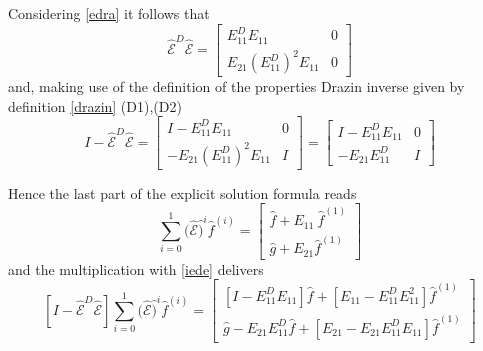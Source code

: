 \documentclass[a4paper,10pt,BCOR=15mm]{scrbook}
\begin{document}
Considering \eqref{edra} it follows that 
\begin{equation*} 
\hat {\mathcal E}^D \hat {\mathcal E} = \begin{bmatrix} E_{11}^DE_{11} & 0 \\ E_{21}(E_{11}^D)^2E_{11} & 0 \end{bmatrix}
\end{equation*}
and, making use of the definition of the properties Drazin inverse given by definition \ref{drazin} (D1),(D2)
\begin{equation}\label{iede}
  I-\hat {\mathcal E}^D \hat {\mathcal E} = \begin{bmatrix} I- E_{11}^DE_{11} & 0 \\ -E_{21}(E_{11}^D)^2E_{11} & I \end{bmatrix} = \begin{bmatrix} I- E_{11}^DE_{11} & 0 \\ -E_{21}E_{11}^D & I \end{bmatrix}
\end{equation}

Hence the last part of the explicit solution formula reads
\begin{equation*}
 \sum_{i=0}^{1} (\hat {\mathcal E}\hat )^i \hat f^{(i)} = \begin{bmatrix}\hat f+E_{11}\ \hat{f}^{(1)} \\  \hat g+E_{21} \hat{f}^{(1)} \end{bmatrix}
\end{equation*}
and the multiplication with \eqref{iede} delivers
\begin{equation}\label{lastt}
  [I-\hat {\mathcal E}^D \hat {\mathcal E}] \sum_{i=0}^{1} (\hat {\mathcal E}\hat )^i \hat f^{(i)}= \begin{bmatrix} [I-E_{11}^D E_{11}] \hat f + [E_{11}-E_{11}^D E_{11}^2] \hat{f}^{(1)} \\ \hat g -E_{21}E_{11}^D \hat f+[E_{21}-E_{21}E_{11}^D E_{11}] \hat{f}^{(1)}\end{bmatrix}
\end{equation}
\end{document}
